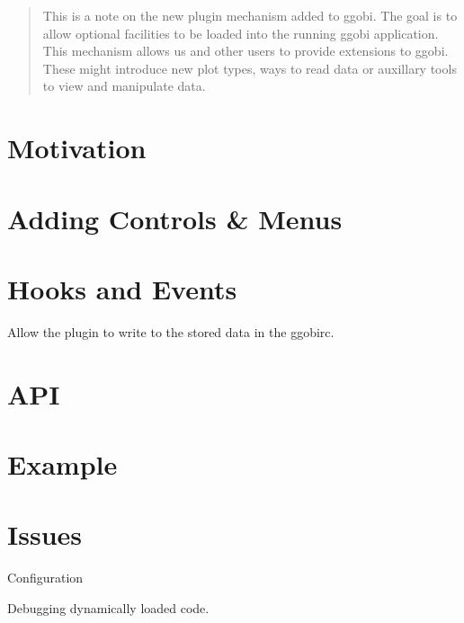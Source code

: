\documentclass{article}
\begin{document}
\begin{abstract}
  This is a note on the new plugin mechanism added to ggobi. The goal
  is to allow optional facilities to be loaded into the running ggobi
  application.
 This mechanism allows us and other users to provide extensions
 to ggobi. These  might introduce new plot types, ways
 to read data or auxillary tools to view and manipulate
 data.

\end{abstract}

\section{Motivation}

\section{Adding Controls \& Menus}

\section{Hooks and Events}
Allow the plugin to write to the stored data
in the ggobirc.

\section{API}

\section{Example}

\section{Issues}
Configuration

Debugging dynamically loaded code.
\end{document}
